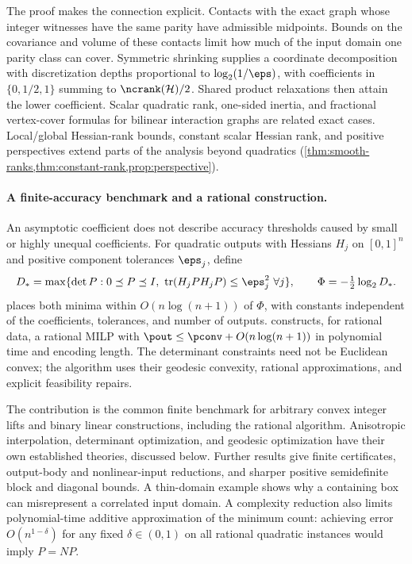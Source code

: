 The proof makes the connection explicit. Contacts with the exact graph
whose integer witnesses have the same parity have admissible midpoints.
Bounds on the covariance and volume of these contacts limit how much of
the input domain one parity class can cover. Symmetric shrinking supplies
a coordinate decomposition with discretization depths proportional to
$\log_2(1/\eps)$, with coefficients in $\{0,1/2,1\}$ summing to
$\ncrank(\mathcal H)/2$. Shared product relaxations then attain the lower
coefficient. Scalar quadratic rank, one-sided inertia, and fractional
vertex-cover formulas for bilinear interaction graphs are related exact
cases. Local/global Hessian-rank bounds, constant scalar Hessian rank,
and positive perspectives extend parts of the analysis beyond quadratics
(\cref{thm:smooth-ranks,thm:constant-rank,prop:perspective}).

\paragraph{A finite-accuracy benchmark and a rational construction.}
An asymptotic coefficient does not describe accuracy thresholds caused by
small or highly unequal coefficients. For quadratic outputs with Hessians
$H_j$ on $[0,1]^n$ and positive component tolerances $\eps_j$, define
\[
 D_* = \max\{\det P:0\preceq P\preceq I,
       \ \operatorname{tr}(H_jPH_jP)\le\eps_j^2\ \forall j\},
 \qquad \Phi=-\tfrac12\log_2 D_*.
\]
 places both minima within
$O(n\log(n+1))$ of $\Phi$, with constants independent of the coefficients,
tolerances, and number of outputs.  constructs,
for rational data, a rational MILP with
$\pout\le\pconv+O(n\log(n+1))$ in polynomial time and encoding length.
The determinant constraints need not be Euclidean convex; the algorithm
uses their geodesic convexity, rational approximations, and explicit
feasibility repairs.

The contribution is the common finite benchmark for arbitrary convex
integer lifts and binary linear constructions, including the rational
algorithm. Anisotropic interpolation, determinant optimization, and
geodesic optimization have their own established theories, discussed
below. Further results give finite certificates, output-body and
nonlinear-input reductions, and sharper positive semidefinite block and
diagonal bounds. A thin-domain example shows why a containing box can
misrepresent a correlated input domain. A complexity reduction also limits
polynomial-time additive approximation of the minimum count: achieving
error $O(n^{1-\delta})$ for any fixed $\delta\in(0,1)$ on all rational
quadratic instances would imply $P=NP$.

